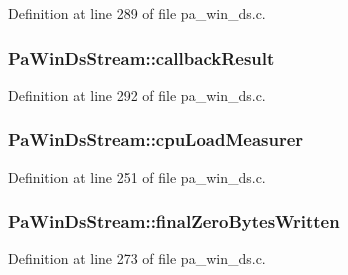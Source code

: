 Definition at line 289 of file pa\+\_\+win\+\_\+ds.\+c.

\subsubsection[{\texorpdfstring{callback\+Result}{callbackResult}}]{ Pa\+Win\+Ds\+Stream\+::callback\+Result}\hypertarget{struct_pa_win_ds_stream_af4cfae9d5f9e287396b6868125decb33}{}\label{struct_pa_win_ds_stream_af4cfae9d5f9e287396b6868125decb33}


Definition at line 292 of file pa\+\_\+win\+\_\+ds.\+c.

\subsubsection[{\texorpdfstring{cpu\+Load\+Measurer}{cpuLoadMeasurer}}]{ Pa\+Win\+Ds\+Stream\+::cpu\+Load\+Measurer}\hypertarget{struct_pa_win_ds_stream_a607c1644f8f390244723e854e30cf167}{}\label{struct_pa_win_ds_stream_a607c1644f8f390244723e854e30cf167}


Definition at line 251 of file pa\+\_\+win\+\_\+ds.\+c.

\subsubsection[{\texorpdfstring{final\+Zero\+Bytes\+Written}{finalZeroBytesWritten}}]{ Pa\+Win\+Ds\+Stream\+::final\+Zero\+Bytes\+Written}\hypertarget{struct_pa_win_ds_stream_acd51ef94d9e64347740607961f5a81a3}{}\label{struct_pa_win_ds_stream_acd51ef94d9e64347740607961f5a81a3}


Definition at line 273 of file pa\+\_\+win\+\_\+ds.\+c.

